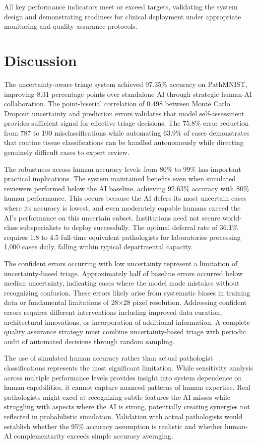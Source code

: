 \documentclass[10pt,a4paper]{article}
\begin{document}
All key performance indicators meet or exceed targets, validating the system design and demonstrating readiness for clinical deployment under appropriate monitoring and quality assurance protocols.
\section{Discussion}

The uncertainty-aware triage system achieved 97.35\% accuracy on PathMNIST, improving 8.31 percentage points over standalone AI through strategic human-AI collaboration. The point-biserial correlation of 0.498 between Monte Carlo Dropout uncertainty and prediction errors validates that model self-assessment provides sufficient signal for effective triage decisions. The 75.8\% error reduction from 787 to 190 misclassifications while automating 63.9\% of cases demonstrates that routine tissue classifications can be handled autonomously while directing genuinely difficult cases to expert review.

The robustness across human accuracy levels from 80\% to 99\% has important practical implications. The system maintained benefits even when simulated reviewers performed below the AI baseline, achieving 92.63\% accuracy with 80\% human performance. This occurs because the AI defers its most uncertain cases where its accuracy is lowest, and even moderately capable humans exceed the AI's performance on this uncertain subset. Institutions need not secure world-class subspecialists to deploy successfully. The optimal deferral rate of 36.1\% requires 1.8 to 4.5 full-time equivalent pathologists for laboratories processing 1,000 cases daily, falling within typical departmental capacity.

The confident errors occurring with low uncertainty represent a limitation of uncertainty-based triage. Approximately half of baseline errors occurred below median uncertainty, indicating cases where the model made mistakes without recognizing confusion. These errors likely arise from systematic biases in training data or fundamental limitations of 28×28 pixel resolution. Addressing confident errors requires different interventions including improved data curation, architectural innovations, or incorporation of additional information. A complete quality assurance strategy must combine uncertainty-based triage with periodic audit of automated decisions through random sampling.

The use of simulated human accuracy rather than actual pathologist classifications represents the most significant limitation. While sensitivity analysis across multiple performance levels provides insight into system dependence on human capabilities, it cannot capture nuanced patterns of human expertise. Real pathologists might excel at recognizing subtle features the AI misses while struggling with aspects where the AI is strong, potentially creating synergies not reflected in probabilistic simulation. Validation with actual pathologists would establish whether the 95\% accuracy assumption is realistic and whether human-AI complementarity exceeds simple accuracy averaging.
\end{document}
